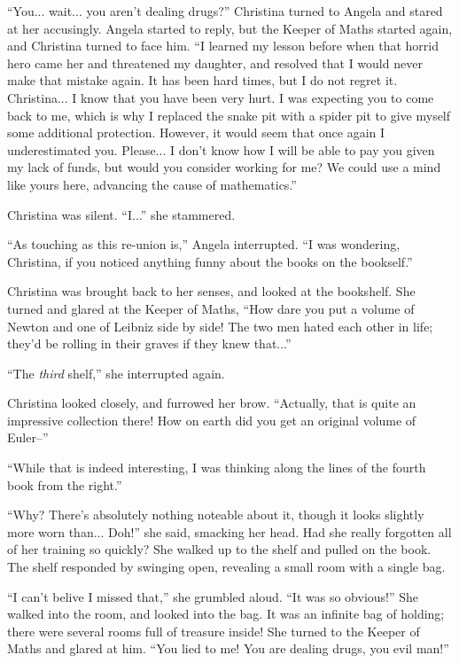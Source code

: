 \documentclass[showtrims,b6paper,draft,10pt]{memoir}
\begin{document}
``You... wait... you aren't dealing drugs?''  Christina turned to Angela and stared at her accusingly.  Angela started to reply, but the Keeper of Maths started again, and Christina turned to face him.  ``I learned my lesson before when that horrid hero came her and threatened my daughter, and resolved that I would never make that mistake again.  It has been hard times, but I do not regret it.  Christina... I know that you have been very hurt.  I was expecting you to come back to me, which is why I replaced the snake pit with a spider pit to give myself some additional protection.  However, it would seem that once again I underestimated you.  Please...  I don't know how I will be able to pay you given my lack of funds, but would you consider working for me?  We could use a mind like yours here, advancing the cause of mathematics.''

Christina was silent.  ``I...'' she stammered.

``As touching as this re-union is,'' Angela interrupted.  ``I was wondering, Christina, if you noticed anything funny about the books on the bookself.''

Christina was brought back to her senses, and looked at the bookshelf.  She turned and glared at the Keeper of Maths, ``How dare you put a volume of Newton and one of Leibniz side by side!  The two men hated each other in life;  they'd be rolling in their graves if they knew that...''

``The \emph{third} shelf,'' she interrupted again.

Christina looked closely, and furrowed her brow.  ``Actually, that is quite an impressive collection there!  How on earth did you get an original volume of Euler--''

``While that is indeed interesting, I was thinking along the lines of the fourth book from the right.''

``Why?  There's absolutely nothing noteable about it, though it looks slightly more worn than... Doh!'' she said, smacking her head.  Had she really forgotten all of her training so quickly?  She walked up to the shelf and pulled on the book.  The shelf responded by swinging open, revealing a small room with a single bag.

``I can't belive I missed that,'' she grumbled aloud.  ``It was so obvious!''  She walked into the room, and looked into the bag.  It was an infinite bag of holding;  there were several rooms full of treasure inside!  She turned to the Keeper of Maths and glared at him.  ``You lied to me!  You are dealing drugs, you evil man!''
\end{document}
